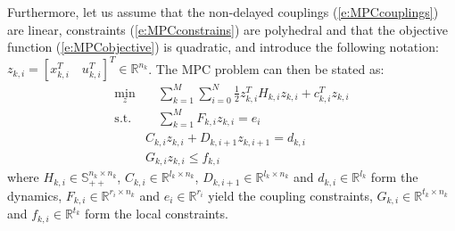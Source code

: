 Furthermore, let us assume that the non-delayed couplings (\ref{e:MPCcouplings}) are linear, constraints (\ref{e:MPCconstrains}) are polyhedral and that the objective function (\ref{e:MPCobjective}) is quadratic, and introduce the following notation: $z_{k,i} = [x_{k,i}^T \quad u_{k,i}^T]^T \in \mathbb{R}^{n_{k}}$. The MPC problem can then be stated as:
\begin{subequations}
\label{e:problem}
\begin{align}
\min_z & \quad \sum_{k=1}^{M} \sum_{i=0}^N \frac{1}{2}z_{k,i}^TH_{k,i}z_{k,i} + c_{k,i}^Tz_{k,i} \label{e:1} \\
\text{s.t.} & \quad \sum_{k=1}^{M} F_{k,i}z_{k,i} = e_i \label{e:CoupConstControl} \\
& C_{k,i}z_{k,i} + D_{k,i+1}z_{k,i+1} = d_{k,i}  \label{e:dynamics} \\
& G_{k,i}z_{k,i} \leq f_{k,i}
\end{align}
\end{subequations}
where $H_{k,i} \in \mathbb{S}_{++}^{n_{k} \times n_{k}}$, $C_{k,i} \in \mathbb{R}^{l_{k} \times n_{k}}$, $D_{k,i+1} \in \mathbb{R}^{l_{k} \times n_{k}}$ and $d_{k,i} \in \mathbb{R}^{l_{k}}$ form the dynamics, $F_{k,i} \in \mathbb{R}^{r_{i} \times n_{k}}$ and $e_i \in \mathbb{R}^{r_i}$ yield the coupling constraints, $G_{k,i} \in \mathbb{R}^{t_{k} \times n_{k}}$ and $f_{k,i} \in \mathbb{R}^{t_{k}}$ form the local constraints.

